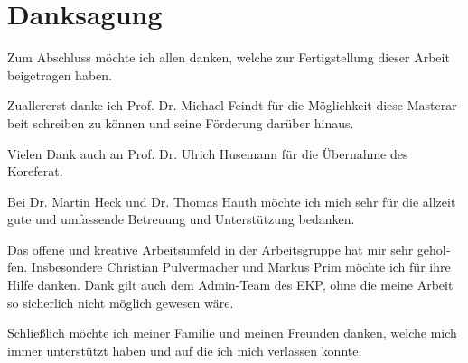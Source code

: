 \chapter*{Danksagung}
\begin{otherlanguage}{ngerman}
Zum Abschluss möchte ich allen danken, welche zur Fertigstellung dieser Arbeit beigetragen haben.

Zuallererst danke ich Prof. Dr. Michael Feindt für die Möglichkeit diese Masterarbeit schreiben zu können und seine Förderung darüber hinaus.

Vielen Dank auch an Prof. Dr. Ulrich Husemann für die Übernahme des Koreferat.

Bei Dr. Martin Heck und Dr. Thomas Hauth möchte ich mich sehr für die allzeit gute und umfassende Betreuung und Unterstützung bedanken.

Das offene und kreative Arbeitsumfeld in der Arbeitsgruppe hat mir sehr geholfen. Insbesondere Christian Pulvermacher und Markus Prim möchte ich für ihre Hilfe danken. Dank gilt auch dem Admin-Team des EKP, ohne die meine Arbeit so sicherlich nicht möglich gewesen wäre.

Schließlich möchte ich meiner Familie und meinen Freunden danken, welche mich immer unterstützt haben und auf die ich mich verlassen konnte.
\end{otherlanguage}